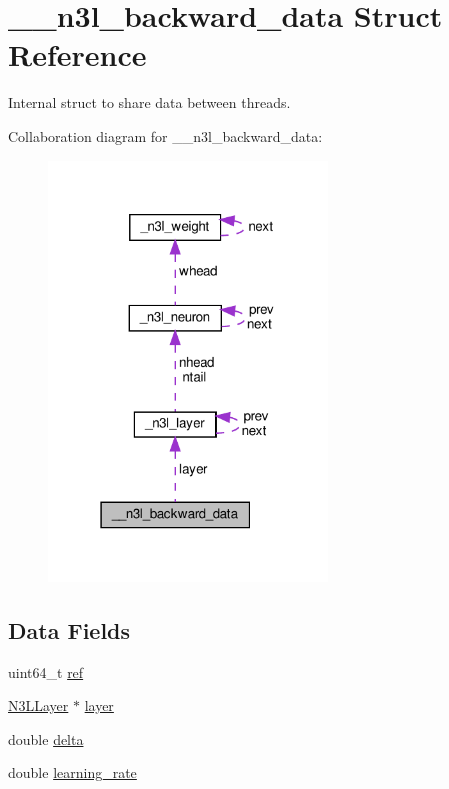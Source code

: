 \hypertarget{struct____n3l__backward__data}{}\section{\+\_\+\+\_\+n3l\+\_\+backward\+\_\+data Struct Reference}
\label{struct____n3l__backward__data}


Internal struct to share data between threads.  




Collaboration diagram for \+\_\+\+\_\+n3l\+\_\+backward\+\_\+data\+:\nopagebreak
\begin{figure}[H]
\begin{center}
\leavevmode
\includegraphics[width=210pt]{struct____n3l__backward__data__coll__graph}
\end{center}
\end{figure}
\subsection*{Data Fields}
\begin{DoxyCompactItemize}
\item 
uint64\+\_\+t \hyperlink{struct____n3l__backward__data_a32ef8a9b7e79121a563b8cd5486f88d3}{ref}
\item 
\hyperlink{n3__header_8h_a9ee3a7104816bdb6222148cfe9ca8ad9}{N3\+L\+Layer} $\ast$ \hyperlink{struct____n3l__backward__data_a0dcc17f32256df3e7ec65046236ffd24}{layer}
\item 
double \hyperlink{struct____n3l__backward__data_ab41bb2c143496d239fe41b208809cc85}{delta}
\item 
double \hyperlink{struct____n3l__backward__data_aa29c1bf7dcb85bfaaa0ec9b01cecc425}{learning\+\_\+rate}
\end{DoxyCompactItemize}


